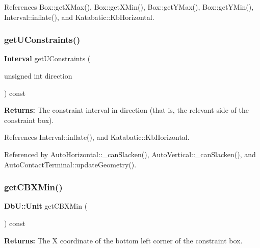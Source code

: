 References Box\+::get\+X\+Max(), Box\+::get\+X\+Min(), Box\+::get\+Y\+Max(), Box\+::get\+Y\+Min(), Interval\+::inflate(), and Katabatic\+::\+Kb\+Horizontal.

\mbox{\label{classKatabatic_1_1AutoContact_ab1fd3fec6dd56d40217b8a5ecacb1719}} 
\subsubsection{\texorpdfstring{get\+U\+Constraints()}{getUConstraints()}}
{\footnotesize\ttfamily \textbf{ Interval} get\+U\+Constraints (\begin{DoxyParamCaption}\item[{unsigned int}]{direction }\end{DoxyParamCaption}) const}

{\bfseries Returns\+:} The constraint interval in {\ttfamily direction} (that is, the relevant side of the constraint box). 

References Interval\+::inflate(), and Katabatic\+::\+Kb\+Horizontal.



Referenced by Auto\+Horizontal\+::\+\_\+can\+Slacken(), Auto\+Vertical\+::\+\_\+can\+Slacken(), and Auto\+Contact\+Terminal\+::update\+Geometry().

\mbox{\label{classKatabatic_1_1AutoContact_a347244bd3f3a59881a2dee9801c74618}} 
\subsubsection{\texorpdfstring{get\+C\+B\+X\+Min()}{getCBXMin()}}
{\footnotesize\ttfamily \textbf{ Db\+U\+::\+Unit} get\+C\+B\+X\+Min (\begin{DoxyParamCaption}{ }\end{DoxyParamCaption}) const\hspace{0.3cm}{\ttfamily [inline]}}

{\bfseries Returns\+:} The X coordinate of the bottom left corner of the constraint box. 


